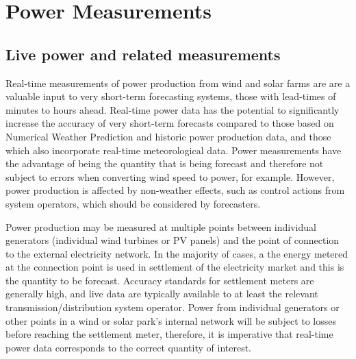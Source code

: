 \chapter{Power Measurements {\color{magenta}{Contributing author: JB }}}

\label{ch:performanceassessment}

\noindent
{}





\section{Live power and related measurements}
\label{sec:power_scada}


Real-time measurements of power production from wind and solar farms are are a valuable input to very short-term forecasting systems, those with lead-times of minutes to hours ahead. Real-time power data has the potential to significantly increase the accuracy of very short-term forecasts compared to those based on Numerical Weather Prediction and historic power production data, and those which also incorporate real-time meteorological data. Power measurements have the advantage of being the quantity that is being forecast and therefore not subject to errors when converting wind speed to power, for example. However, power production is affected by non-weather effects, such as control actions from system operators, which should be considered by forecasters.

Power production may be measured at multiple points between individual generators (individual wind turbines or PV panels) and the point of connection to the external electricity network. In the majority of cases, a the energy metered at the connection point is used in settlement of the electricity market and this is the quantity to be forecast. Accuracy standards for settlement meters are generally high, and live data are typically available to at least the relevant transmission/distribution system operator. Power from individual generators or other points in a wind or solar park's internal network will be subject to losses before reaching the settlement meter, therefore, it is imperative that real-time power data corresponds to the correct quantity of interest.

